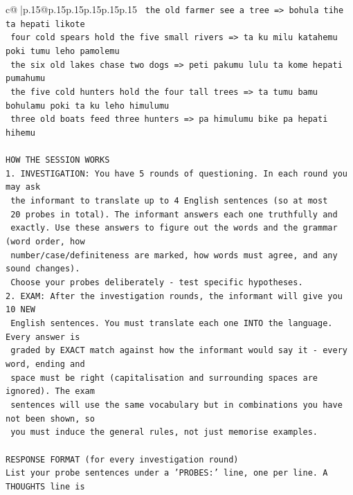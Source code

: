 \documentclass{article}
\begin{document}
{\begin{supertabular}{c@{$\;$}|p{.15\linewidth}@{}p{.15\linewidth}p{.15\linewidth}p{.15\linewidth}p{.15\linewidth}p{.15\linewidth}}
{{{\texttt{    the old farmer see a tree  =>  bohula tihe ta hepati likote} \\
\texttt{    four cold spears hold the five small rivers  =>  ta ku milu katahemu poki tumu leho pamolemu} \\
\texttt{    the six old lakes chase two dogs  =>  peti pakumu lulu ta kome hepati pumahumu} \\
\texttt{    the five cold hunters hold the four tall trees  =>  ta tumu bamu bohulamu poki ta ku leho himulumu} \\
\texttt{    three old boats feed three hunters  =>  pa himulumu bike pa hepati hihemu} \\
\\ 
\texttt{HOW THE SESSION WORKS} \\
\texttt{1. INVESTIGATION: You have 5 rounds of questioning. In each round you may ask} \\
\texttt{   the informant to translate up to 4 English sentences (so at most} \\
\texttt{   20 probes in total). The informant answers each one truthfully and} \\
\texttt{   exactly. Use these answers to figure out the words and the grammar (word order, how} \\
\texttt{   number/case/definiteness are marked, how words must agree, and any sound changes).} \\
\texttt{   Choose your probes deliberately {-} test specific hypotheses.} \\
\texttt{2. EXAM: After the investigation rounds, the informant will give you 10 NEW} \\
\texttt{   English sentences. You must translate each one INTO the language. Every answer is} \\
\texttt{   graded by EXACT match against how the informant would say it {-} every word, ending and} \\
\texttt{   space must be right (capitalisation and surrounding spaces are ignored). The exam} \\
\texttt{   sentences will use the same vocabulary but in combinations you have not been shown, so} \\
\texttt{   you must induce the general rules, not just memorise examples.} \\
\\ 
\texttt{RESPONSE FORMAT (for every investigation round)} \\
\texttt{List your probe sentences under a 'PROBES:' line, one per line. A THOUGHTS line is} \\
}}}
\end{supertabular}}
\end{document}
